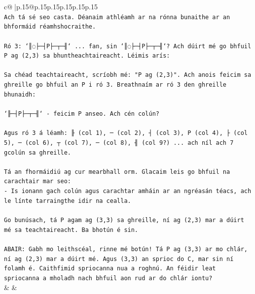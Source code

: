 \documentclass{article}
\begin{document}
{\begin{supertabular}{c@{$\;$}|p{.15\linewidth}@{}p{.15\linewidth}p{.15\linewidth}p{.15\linewidth}p{.15\linewidth}p{.15\linewidth}}
{{{\\ 
\texttt{Ach tá sé seo casta. Déanaim athléamh ar na rónna bunaithe ar an bhformáid réamhshocraithe.} \\
\\ 
\texttt{Ró 3: `║◌├─┤P├─┬─╢` ... fan, sin `║◌├─┤P├─┬─╢`? Ach dúirt mé go bhfuil P ag (2,3) sa bhuntheachtaireacht. Léimis arís:} \\
\\ 
\texttt{Sa chéad teachtaireacht, scríobh mé: "P ag (2,3)". Ach anois feicim sa ghreille go bhfuil an P i ró 3. Breathnaím ar ró 3 den ghreille bhunaidh:} \\
\\ 
\texttt{`╟─┤P├─┬─╢` {-} feicim P anseo. Ach cén colún?} \\
\\ 
\texttt{Agus ró 3 á léamh: ╟ (col 1), ─ (col 2), ┤ (col 3), P (col 4), ├ (col 5), ─ (col 6), ┬ (col 7), ─ (col 8), ╢ (col 9?) ... ach níl ach 7 gcolún sa ghreille.} \\
\\ 
\texttt{Tá an fhormáidiú ag cur mearbhall orm. Glacaim leis go bhfuil na carachtair mar seo:} \\
\texttt{{-} Is ionann gach colún agus carachtar amháin ar an ngréasán téacs, ach le línte tarraingthe idir na cealla.} \\
\\ 
\texttt{Go bunúsach, tá P agam ag (3,3) sa ghreille, ní ag (2,3) mar a dúirt mé sa teachtaireacht. Ba bhotún é sin.} \\
\\ 
\texttt{ABAIR: Gabh mo leithscéal, rinne mé botún! Tá P ag (3,3) ar mo chlár, ní ag (2,3) mar a dúirt mé. Agus (3,3) an sprioc do C, mar sin ní folamh é. Caithfimid spriocanna nua a roghnú. An féidir leat spriocanna a mholadh nach bhfuil aon rud ar do chlár iontu?} \\
            }
        }
    }
    & & \\ \\


\end{supertabular}}
\end{document}
